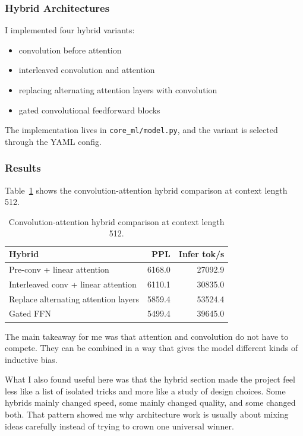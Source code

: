 \documentclass[11pt]{article}
\begin{document}
\subsubsection{Hybrid Architectures}
I implemented four hybrid variants:
\begin{itemize}[leftmargin=*]
  \item convolution before attention
  \item interleaved convolution and attention
  \item replacing alternating attention layers with convolution
  \item gated convolutional feedforward blocks
\end{itemize}

The implementation lives in \texttt{core\_ml/model.py}, and the variant is selected through the YAML config.

\subsubsection{Results}
Table~\ref{tab:hybrid} shows the convolution-attention hybrid comparison at context length 512.

\begin{table}[h]
\centering
\begin{tabular}{lrr}
\toprule
Hybrid & PPL & Infer tok/s \\
\midrule
Pre-conv + linear attention & 6168.0 & 27092.9 \\
Interleaved conv + linear attention & 6110.1 & 30835.0 \\
Replace alternating attention layers & 5859.4 & 53524.4 \\
Gated FFN & 5499.4 & 39645.0 \\
\bottomrule
\end{tabular}
\caption{Convolution-attention hybrid comparison at context length 512.}
\label{tab:hybrid}
\end{table}

The main takeaway for me was that attention and convolution do not have to compete. They can be combined in a way that gives the model different kinds of inductive bias.

What I also found useful here was that the hybrid section made the project feel less like a list of isolated tricks and more like a study of design choices. Some hybrids mainly changed speed, some mainly changed quality, and some changed both. That pattern showed me why architecture work is usually about mixing ideas carefully instead of trying to crown one universal winner.
\end{document}
